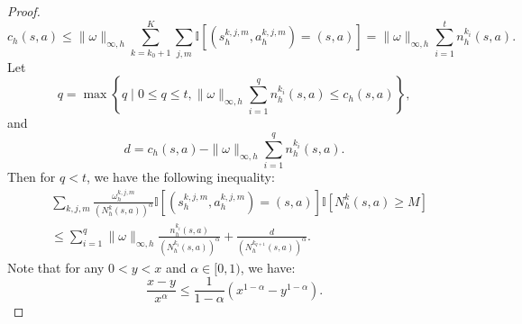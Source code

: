 \documentclass{article}
\begin{document}
\begin{proof}
$$c_h(s,a) \leq \|\omega\|_{\infty,h} \sum_{k=k_0+1}^K\sum_{j, m}\mathbb{I}[(s_h^{k,j,m},a_h^{k,j,m}) = (s,a)] = \|\omega\|_{\infty,h}\sum_{i=1}^t n_h^{k_i}(s,a).$$
Let
$$q = \max\left\{q\mid 0 \leq q \leq t, \|\omega\|_{\infty,h}\sum_{i=1}^q n_h^{k_i}(s,a) \leq c_h(s,a)\right\},$$
and $$d = c_h(s,a) - \|\omega\|_{\infty,h}\sum_{i=1}^q n_h^{k_i}(s,a).$$
Then for $q <t$, we have the following inequality:
\begin{align}
\label{nNmiddle}
    &\sum_{k, j, m}\frac{\omega_{h}^{k, j, m}}{(N_h^k(s,a))^{\alpha}}\mathbb{I}[(s_h^{k,j,m},a_h^{k,j,m}) = (s,a)] \mathbb{I}\left[ N_h^k(s,a)\geq M\right] \nonumber\\
    &\leq \sum_{i=1}^q \|\omega\|_{\infty,h}\frac{n_h^{k_i}(s,a)}{(N_h^{k_i}(s,a))^{\alpha}} + \frac{d}{(N_h^{k_{q+1}}(s,a))^{\alpha}}.
\end{align}
Note that for any $0< y <x$ and $\alpha \in [0,1)$, we have:
\begin{equation}
    \label{lemmaxy}
    \frac{x-y}{x^{\alpha}} \leq \frac{1}{1-\alpha}(x^{1-\alpha}-y^{1-\alpha}).
\end{equation}


\end{proof}
\end{document}
